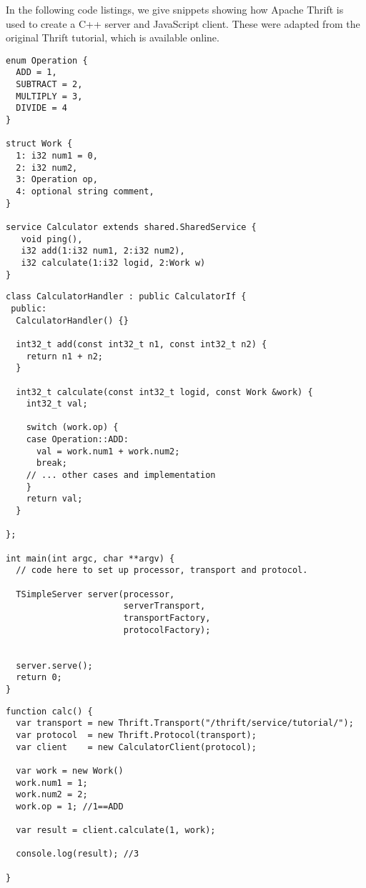 In the following code listings, we give snippets showing how Apache Thrift is used to create a C++ server and JavaScript client. These were adapted from the original Thrift tutorial, which is available online\cite{apachethrift}.

\begin{lstlisting}
enum Operation {
  ADD = 1,
  SUBTRACT = 2,
  MULTIPLY = 3,
  DIVIDE = 4
}

struct Work {
  1: i32 num1 = 0,
  2: i32 num2,
  3: Operation op,
  4: optional string comment,
}

service Calculator extends shared.SharedService {
   void ping(),
   i32 add(1:i32 num1, 2:i32 num2),
   i32 calculate(1:i32 logid, 2:Work w)
}
\end{lstlisting}

\begin{lstlisting}
class CalculatorHandler : public CalculatorIf {
 public:
  CalculatorHandler() {}

  int32_t add(const int32_t n1, const int32_t n2) {
    return n1 + n2;
  }

  int32_t calculate(const int32_t logid, const Work &work) {
    int32_t val;

    switch (work.op) {
    case Operation::ADD:
      val = work.num1 + work.num2;
      break;
    // ... other cases and implementation
    }
    return val;
  }

};

int main(int argc, char **argv) {
  // code here to set up processor, transport and protocol.

  TSimpleServer server(processor,
                       serverTransport,
                       transportFactory,
                       protocolFactory);


  server.serve();
  return 0;
}
\end{lstlisting}


\begin{lstlisting}
function calc() {
  var transport = new Thrift.Transport("/thrift/service/tutorial/");
  var protocol  = new Thrift.Protocol(transport);
  var client    = new CalculatorClient(protocol);

  var work = new Work()
  work.num1 = 1;
  work.num2 = 2;
  work.op = 1; //1==ADD

  var result = client.calculate(1, work);

  console.log(result); //3
  
}
\end{lstlisting}


